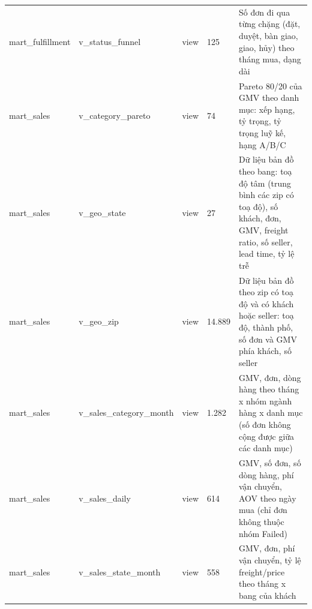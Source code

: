 {\begin{longtable}{llllp{6.3cm}}
mart\_fulfillment & v\_status\_funnel & view & 125 & Số đơn đi qua từng chặng (đặt, duyệt, bàn giao, giao, hủy) theo tháng mua, dạng dài \\
mart\_sales & v\_category\_pareto & view & 74 & Pareto 80/20 của GMV theo danh mục: xếp hạng, tỷ trọng, tỷ trọng luỹ kế, hạng A/B/C \\
mart\_sales & v\_geo\_state & view & 27 & Dữ liệu bản đồ theo bang: toạ độ tâm (trung bình các zip có toạ độ), số khách, đơn, GMV, freight ratio, số seller, lead time, tỷ lệ trễ \\
mart\_sales & v\_geo\_zip & view & 14.889 & Dữ liệu bản đồ theo zip có toạ độ và có khách hoặc seller: toạ độ, thành phố, số đơn và GMV phía khách, số seller \\
mart\_sales & v\_sales\_category\_month & view & 1.282 & GMV, đơn, dòng hàng theo tháng x nhóm ngành hàng x danh mục (số đơn không cộng được giữa các danh mục) \\
mart\_sales & v\_sales\_daily & view & 614 & GMV, số đơn, số dòng hàng, phí vận chuyển, AOV theo ngày mua (chỉ đơn không thuộc nhóm Failed) \\
mart\_sales & v\_sales\_state\_month & view & 558 & GMV, đơn, phí vận chuyển, tỷ lệ freight/price theo tháng x bang của khách \\
\end{longtable}}
